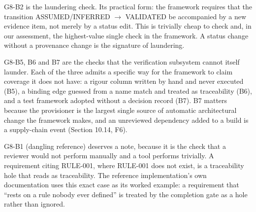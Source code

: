 \documentclass[11pt,a4paper]{article}
\newcommand{\sevlabel}[1]{%
  \ifstrequal{#1}{BLOCKER}{\textcolor{sevblocker}{\textbf{#1}}}%
  {\ifstrequal{#1}{WARNING}{\textcolor{sevwarning}{\textbf{#1}}}%
  {\textcolor{sevnote}{#1}}}}
\begin{document}
\begin{table}[H]
\end{table}

G8-B2 is the laundering check. Its practical form: the framework requires that the transition ASSUMED/INFERRED $\rightarrow$ VALIDATED be accompanied by a new evidence item, not merely by a status edit. This is trivially cheap to check and, in our assessment, the highest-value single check in the framework. A status change without a provenance change is the signature of laundering.

G8-B5, B6 and B7 are the checks that the verification subsystem cannot itself launder. Each of the three admits a specific way for the framework to claim coverage it does not have: a rigour column written by hand and never executed (B5), a binding edge guessed from a name match and treated as traceability (B6), and a test framework adopted without a decision record (B7). B7 matters because the provisioner is the largest single source of automatic architectural change the framework makes, and an unreviewed dependency added to a build is a supply-chain event (Section 10.14, F6).

G8-B1 (dangling reference) deserves a note, because it is the check that a reviewer would not perform manually and a tool performs trivially. A requirement citing RULE-001, where RULE-001 does not exist, is a traceability hole that reads as traceability. The reference implementation's own documentation uses this exact case as its worked example: a requirement that ``rests on a rule nobody ever defined'' is treated by the completion gate as a hole rather than ignored.
\end{document}

